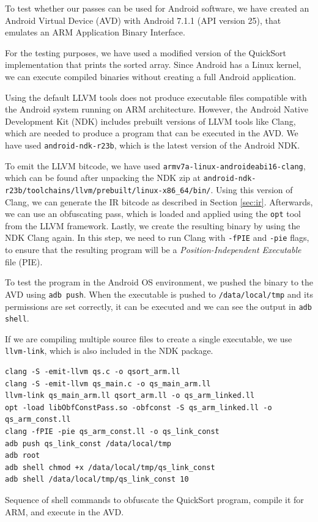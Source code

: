 \documentclass[
  digital, %
  notable,   %
  twoside, %
  nolof,     %
  nolot,     %
]{fithesis3}
\theoremstyle{definition}
\begin{document}
To test whether our passes can be used for Android software, we have created an Android Virtual Device (AVD) with Android 7.1.1 (API version 25), that emulates an ARM Application Binary Interface. 

For the testing purposes, we have used a modified version of the QuickSort implementation that prints the sorted array. Since Android has a Linux kernel, we can execute compiled binaries without creating a full Android application. 

Using the default LLVM tools does not produce executable files compatible with the Android system running on ARM architecture. However, the Android Native Development Kit (NDK) includes prebuilt versions of LLVM tools like Clang, which are needed to produce a program that can be executed in the AVD. We have used \texttt{android-ndk-r23b}, which is the latest version of the Android NDK.

To emit the LLVM bitcode, we have used \texttt{armv7a-linux-androideabi16-clang}, which can be found after unpacking the NDK zip at \texttt{android-ndk-r23b/toolchains/llvm/prebuilt/linux-x86\_64/bin/}. Using this version of Clang, we can generate the IR bitcode as described in Section \ref{sec:ir}. Afterwards, we can use an obfuscating pass, which is loaded and applied using the \texttt{opt} tool from the LLVM framework. Lastly, we create the resulting binary by using the NDK Clang again. In this step, we need to run Clang with \texttt{-fPIE} and \texttt{-pie} flags, to ensure that the resulting program will be a \textit{Position-Independent Executable} file (PIE).

To test the program in the Android OS environment, we pushed the binary to the AVD using \texttt{adb push}. When the executable is pushed to \texttt{/data/local/tmp} and its permissions are set correctly, it can be executed and we can see the output in \texttt{adb shell}. 

If we are compiling multiple source files to create a single executable, we use \texttt{llvm-link}, which is also included in the NDK package. 

\begin{listing}
\begin{verbatim}
clang -S -emit-llvm qs.c -o qsort_arm.ll
clang -S -emit-llvm qs_main.c -o qs_main_arm.ll
llvm-link qs_main_arm.ll qsort_arm.ll -o qs_arm_linked.ll
opt -load libObfConstPass.so -obfconst -S qs_arm_linked.ll -o qs_arm_const.ll
clang -fPIE -pie qs_arm_const.ll -o qs_link_const
adb push qs_link_const /data/local/tmp
adb root
adb shell chmod +x /data/local/tmp/qs_link_const
adb shell /data/local/tmp/qs_link_const 10
\end{verbatim}
\label{lst:arm}
\caption{Sequence of shell commands to obfuscate the QuickSort program, compile it for ARM, and execute in the AVD.}
\end{listing}
\end{document}
